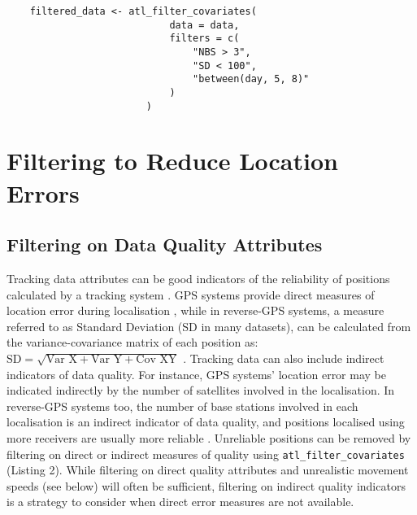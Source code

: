 \begin{refsection}
\begin{lstlisting}
    filtered_data <- atl_filter_covariates(
                            data = data,
                            filters = c(
                                "NBS > 3",
                                "SD < 100",
                                "between(day, 5, 8)"
                            )
                        )                            
    \end{lstlisting}

    \section{Filtering to Reduce Location Errors}

    \subsection{Filtering on Data Quality Attributes}

    Tracking data attributes can be good indicators of the reliability of positions calculated by a tracking system \citep{beardsworth2021}.
    GPS systems provide direct measures of location error during localisation \citep[Horizontal Dilution of Precision, HDOP in GPS]{ranacher2016}, while  in reverse-GPS systems, a measure referred to as Standard Deviation (SD in many datasets), can be calculated from the variance-covariance matrix of each position as: $\text{SD} = \sqrt{\text{Var X} + \text{Var Y} + \text{Cov XY}}$ \citep[see details in][]{maccurdy2009, maccurdy2019, weiser2016, ranacher2016}.
    Tracking data can also include indirect indicators of data quality.
    For instance, GPS systems' location error may be indicated indirectly by the number of satellites involved in the localisation.
    In reverse-GPS systems too, the number of base stations involved in each localisation is an indirect indicator of data quality, and positions localised using more receivers are usually more reliable \citep[the minimum required for an ATLAS localisation is 3; see][]{weiser2016, beardsworth2021}.
    Unreliable positions can be removed by filtering on direct or indirect measures of quality using \texttt{atl\_filter\_covariates} (Listing 2).
    While filtering on direct quality attributes and unrealistic movement speeds (see below) will often be sufficient, filtering on indirect quality indicators is a strategy to consider when direct error measures are not available.


\end{refsection}
